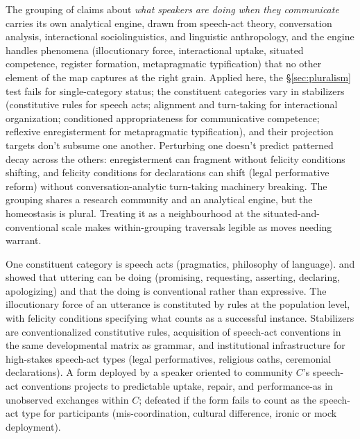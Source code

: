 \documentclass[12pt]{article}
\begin{document}
The grouping of  claims about \emph{what speakers are doing when they communicate} carries its own analytical engine, drawn from speech-act theory, conversation analysis, interactional sociolinguistics, and linguistic anthropology, and the engine handles phenomena (illocutionary force, interactional uptake, situated competence, register formation, metapragmatic typification) that no other element of the map captures at the right grain. Applied here, the §\ref{sec:pluralism} test fails for single-category status; the constituent categories vary in stabilizers (constitutive rules for speech acts; alignment and turn-taking for interactional organization; conditioned appropriateness for communicative competence; reflexive enregisterment for metapragmatic typification), and their projection targets don't subsume one another. Perturbing one doesn't predict patterned decay across the others: enregisterment can fragment without felicity conditions shifting, and felicity conditions for declarations can shift (legal performative reform) without conversation-analytic turn-taking machinery breaking. The grouping shares a research community and an analytical engine, but the homeostasis is plural. Treating it as a neighbourhood at the situated-and-conventional scale makes within-grouping traversals legible as moves needing warrant.

One constituent category is speech acts (pragmatics, philosophy of language). \textcite{austin1962} and \textcite{searle1969} showed that uttering can be doing (promising, requesting, asserting, declaring, apologizing) and that the doing is conventional rather than expressive. The illocutionary force of an utterance is constituted by rules at the population level, with felicity conditions specifying what counts as a successful instance. Stabilizers are conventionalized constitutive rules, acquisition of speech-act conventions in the same developmental matrix as grammar, and institutional infrastructure for high-stakes speech-act types (legal performatives, religious oaths, ceremonial declarations). A form deployed by a speaker oriented to community $C$'s speech-act conventions projects to predictable uptake, repair, and performance-as in unobserved exchanges within $C$; defeated if the form fails to count as the speech-act type for participants (mis-coordination, cultural difference, ironic or mock deployment).
\end{document}
